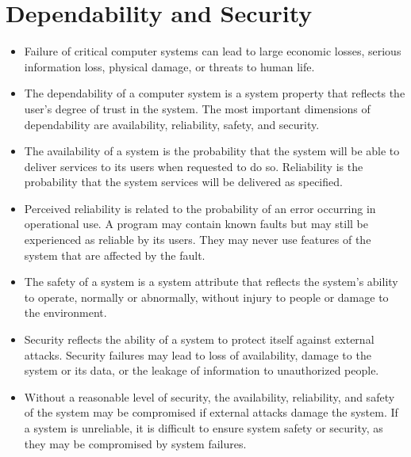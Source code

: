 \documentclass{article}
\begin{document}
\section{Dependability and Security}
\begin{itemize}
    \item Failure of critical computer systems can lead to large economic losses, serious information loss, physical damage, or threats to human life.
    \item The dependability of a computer system is a system property that reflects the user's degree of trust in the system.  The most important dimensions of dependability are availability, reliability, safety, and security.
    \item The availability of a system is the probability that the system will be able to deliver services to its users when requested to do so.  Reliability is the probability that the system services will be delivered as specified.
    \item Perceived reliability is related to the probability of an error occurring in operational use.
        A program may contain known faults but may still be experienced as reliable by its users.  
        They may never use features of the system that are affected by the fault.
    \item The safety of a system is a system attribute that reflects the system's ability to operate, normally or abnormally, without injury to people or damage to the environment.
    \item Security reflects the ability of a system to protect itself against external attacks.  Security failures may lead to loss of availability, damage to the system or its data, or the leakage of information to unauthorized people.
    \item Without a reasonable level of security, the availability, reliability, and safety of the system may be compromised if external attacks damage the system.  If a system is unreliable, it is difficult to ensure system safety or security, as they may be compromised by system failures.
\end{itemize}
\end{document}

